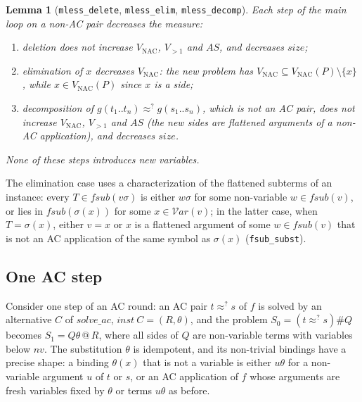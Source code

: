 \documentclass[11pt,a4paper]{article}
\newtheorem{lemma}[theorem]{Lemma}
\theoremstyle{definition}
\theoremstyle{remark}
\newcommand{\isa}[1]{\mbox{\small\texttt{#1}}}
\newcommand{\vars}{\mathcal{V}\mathit{ar}}
\newcommand{\fsub}{\mathit{fsub}}
\newcommand{\VNAC}{V_{\mathrm{NAC}}}
\newcommand{\Vtwo}{V_{>1}}
\newcommand{\AS}{\mathit{AS}}
\newcommand{\psize}{\mathit{size}}
\begin{document}
\begin{lemma}[\isa{mless\_delete}, \isa{mless\_elim}, \isa{mless\_decomp}]
  Each step of the main loop on a non-AC pair decreases the measure:
  \begin{enumerate}[nosep]
    \item deletion does not increase $\VNAC$, $\Vtwo$ and $\AS$, and decreases $\psize$;
    \item elimination of $x$ decreases $\VNAC$: the new problem has $\VNAC \subseteq \VNAC(P)
          \setminus\{x\}$, while $x \in \VNAC(P)$ since $x$ is a side;
    \item decomposition of $g(t_1..t_n) \approx^? g(s_1..s_n)$, which is not an AC pair, does
          not increase $\VNAC$, $\Vtwo$ and $\AS$ (the new sides are flattened arguments of a
          non-AC application), and decreases $\psize$.
  \end{enumerate}
  None of these steps introduces new variables.
\end{lemma}

The elimination case uses a characterization of the flattened subterms of an instance: every
$T \in \fsub(v\sigma)$ is either $w\sigma$ for some non-variable $w \in \fsub(v)$, or lies in
$\fsub(\sigma(x))$ for some $x \in \vars(v)$; in the latter case, when $T = \sigma(x)$, either
$v = x$ or $x$ is a flattened argument of some $w \in \fsub(v)$ that is not an AC application of
the same symbol as $\sigma(x)$ (\isa{fsub\_subst}).

\subsection{One AC step}

Consider one step of an AC round: an AC pair $t \approx^? s$ of $f$ is solved by an alternative
$C$ of $\mathit{solve\_ac}$, $\mathit{inst}\ C = (R, \theta)$, and the problem
$S_0 = (t\approx^?s) \# Q$ becomes $S_1 = Q\theta \mathbin{@} R$, where all sides of $Q$ are
non-variable terms with variables below $\mathit{nv}$. The substitution $\theta$ is idempotent,
and its non-trivial bindings have a precise shape: a binding $\theta(x)$ that is not a variable
is either $u\theta$ for a non-variable argument $u$ of $t$ or $s$, or an AC application of $f$
whose arguments are fresh variables fixed by $\theta$ or terms $u\theta$ as before.
\end{document}
